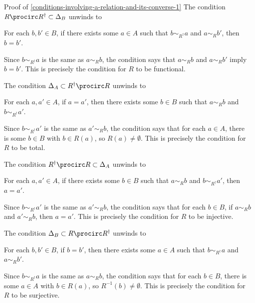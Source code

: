 \begin{Proof}{Proof of \cref{conditions-involving-a-relation-and-its-converse-1}}%
    The condition $R\procirc R^{\dagger}\subset\Delta_{B}$ unwinds to
    \begin{itemize}
        \itemstar For each $b,b'\in B$, if there exists some $a\in A$ such that $b\sim_{R^{\dagger}}a$ and $a\sim_{R}b'$, then $b=b'$.
    \end{itemize}
    Since $b\sim_{R^{\dagger}}a$ is the same as $a\sim_{R}b$, the condition says that $a\sim_{R}b$ and $a\sim_{R}b'$ imply $b=b'$. This is precisely the condition for $R$ to be functional.

    The condition $\Delta_{A}\subset R^{\dagger}\procirc R$ unwinds to
    \begin{itemize}
        \itemstar For each $a,a'\in A$, if $a=a'$, then there exists some $b\in B$ such that $a\sim_{R}b$ and $b\sim_{R^{\dagger}}a'$.
    \end{itemize}
    Since $b\sim_{R^{\dagger}}a'$ is the same as $a'\sim_{R}b$, the condition says that for each $a\in A$, there is some $b\in B$ with $b\in R(a)$, so $R(a)\neq\emptyset$. This is precisely the condition for $R$ to be total.

    The condition $R^{\dagger}\procirc R\subset\Delta_{A}$ unwinds to
    \begin{itemize}
        \itemstar For each $a,a'\in A$, if there exists some $b\in B$ such that $a\sim_{R}b$ and $b\sim_{R^{\dagger}}a'$, then $a=a'$.
    \end{itemize}
    Since $b\sim_{R^{\dagger}}a'$ is the same as $a'\sim_{R}b$, the condition says that for each $b\in B$, if $a\sim_{R}b$ and $a'\sim_{R}b$, then $a=a'$. This is precisely the condition for $R$ to be injective.

    The condition $\Delta_{B}\subset R\procirc R^{\dagger}$ unwinds to
    \begin{itemize}
        \itemstar For each $b,b'\in B$, if $b=b'$, then there exists some $a\in A$ such that $b\sim_{R^{\dagger}}a$ and $a\sim_{R}b'$.
    \end{itemize}
    Since $b\sim_{R^{\dagger}}a$ is the same as $a\sim_{R}b$, the condition says that for each $b\in B$, there is some $a\in A$ with $b\in R(a)$, so $R^{-1}(b)\neq\emptyset$. This is precisely the condition for $R$ to be surjective.
\end{Proof}
